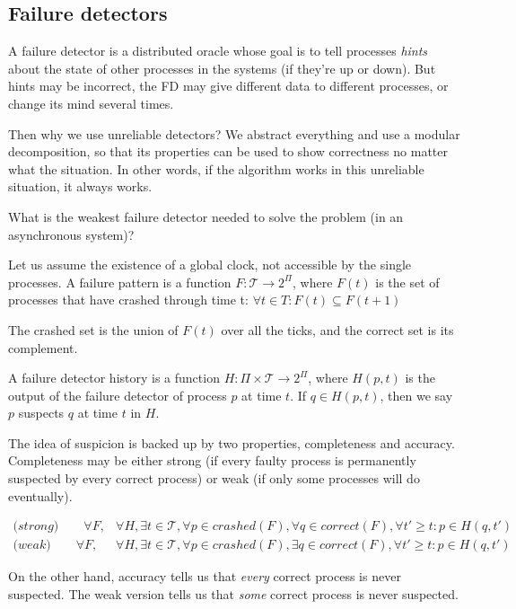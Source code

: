 \documentclass[a4paper,11pt,hidelinks]{article}
\begin{document}
\subsection{Failure detectors}

A failure detector is a distributed oracle whose goal is to tell processes \textit{hints} about the state of other processes in the systems (if they're up or down). But hints may be incorrect, the FD may give different data to different processes, or change its mind several times.

Then why we use unreliable detectors? We abstract everything and use a modular decomposition, so that its properties can be used to show correctness no matter what the situation. In other words, if the algorithm works in this unreliable situation, it always works.

What is the weakest failure detector needed to solve the problem (in an asynchronous system)?

Let us assume the existence of a global clock, not accessible by the single processes. A failure pattern is a function $F: \mathcal{T} \rightarrow 2^{\Pi}$, where $F(t)$ is the set of processes that have crashed through time t: $\forall t \in T: F(t) \subseteq F(t+1)$

The crashed set is the union of $F(t)$ over all the ticks, and the correct set is its complement.

A failure detector history is a function $H: \Pi \times \mathcal{T} \rightarrow 2^{\Pi}$, where $H(p, t)$ is the output of the failure detector of process $p$ at time $t$. If $q \in H(p, t)$, then we say $p$ suspects $q$ at time $t$ in $H$.

The idea of suspicion is backed up by two properties, completeness and accuracy. Completeness may be either strong (if every faulty process is permanently suspected by every correct process) or weak (if only some processes will do eventually).

\begin{align}
    \textit{(strong)}\quad\quad \forall F, & \forall H, \exists t \in \mathcal{T} , \forall p \in crashed(F), \forall q \in correct(F), \forall t' \ge t : p \in H(q, t') \\
    \textit{(weak)}\quad\quad \forall F,   & \forall H, \exists t \in \mathcal{T} , \forall p \in crashed(F), \exists q \in correct(F), \forall t' \ge t : p \in H(q, t')
\end{align}

On the other hand, accuracy tells us that \textit{every} correct process is never suspected. The weak version tells us that \textit{some} correct process is never suspected.
\end{document}
